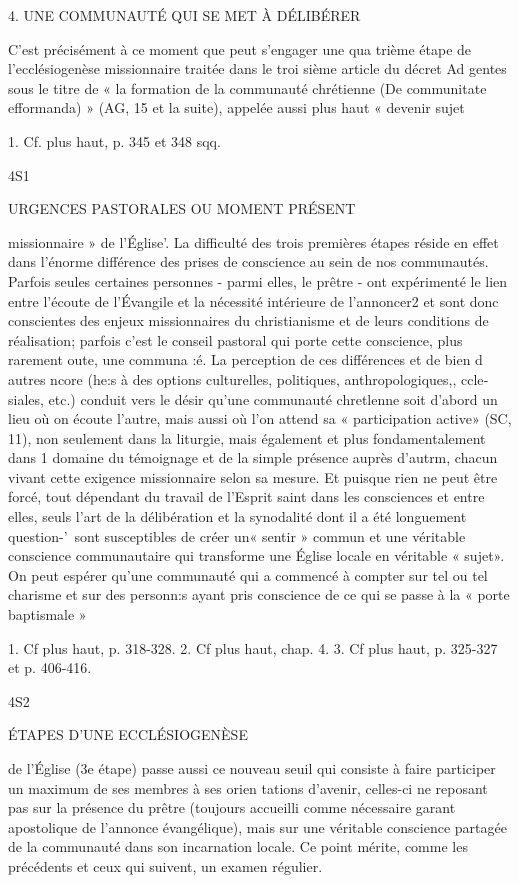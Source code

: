 {{4.	UNE COMMUNAUTÉ QUI SE MET À DÉLIBÉRER

C'est précisément à ce moment que peut s'engager une qua­ trième étape de l'ecclésiogenèse missionnaire traitée dans le troi­ sième article du décret Ad gentes sous le titre de « la formation de la communauté chrétienne (De communitate efformanda) » (AG, 15 et la suite), appelée aussi plus haut « devenir sujet

1. Cf. plus haut, p. 345 et 348 sqq.

4S1
 
URGENCES PASTORALES OU MOMENT PRÉSENT

missionnaire » de l'Église'. La difficulté des trois premières étapes réside en effet dans l'énorme différence des prises de conscience au sein de nos communautés. Parfois seules certaines personnes
-	parmi elles, le prêtre -	ont expérimenté le lien entre l'écoute de l'Évangile et la nécessité intérieure de l'annoncer2 et sont donc conscientes des enjeux missionnaires du christianisme et de leurs conditions de réalisation; parfois c'est le conseil pastoral qui porte cette conscience, plus rarement oute, une communa :é. La perception de ces différences et de bien d autres ncore (he:s à des options culturelles, politiques, anthropologiques,, ccle­ siales, etc.) conduit vers le désir qu'une communauté chretlenne soit d'abord un lieu où on écoute l'autre, mais aussi où l'on attend sa « participation active» (SC, 11), non seulement dans la liturgie, mais également et plus fondamentalement dans 1 domaine du témoignage et de la simple présence auprès d'autrm, chacun vivant cette exigence missionnaire selon sa mesure. Et puisque rien ne peut être forcé, tout dépendant du travail de l'Esprit saint dans les consciences et entre elles, seuls l'art de la délibération et la synodalité dont il a été longuement question-'\ sont susceptibles de créer un« sentir » commun et une véritable conscience communautaire qui transforme une Église locale en véritable « sujet».
On peut espérer qu'une communauté qui a commencé à compter sur tel ou tel charisme et sur des personn:s ayant pris conscience de ce qui se passe à la « porte baptismale »

1.	Cf plus haut, p. 318-328.
2.	Cf plus haut, chap. 4.
3.	Cf plus haut, p. 325-327 et p. 406-416.

4S2
 
ÉTAPES D'UNE ECCLÉSIOGENÈSE

de l'Église (3e étape) passe aussi ce nouveau seuil qui consiste à faire participer un maximum de ses membres à ses orien­ tations d'avenir, celles-ci ne reposant pas sur la présence du prêtre (toujours accueilli comme nécessaire garant apostolique de l'annonce évangélique), mais sur une véritable conscience partagée de la communauté dans son incarnation locale. Ce
point mérite, comme les précédents et ceux qui suivent, un examen régulier.

}}
